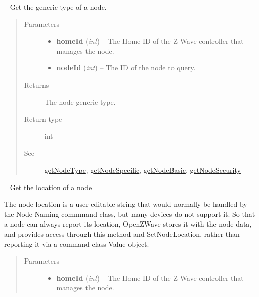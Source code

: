 \documentclass[letterpaper,10pt,english]{sphinxmanual}
\begin{document}
\begin{fulllineitems}
\begin{fulllineitems}
\end{fulllineitems}


\begin{fulllineitems}
\label{libopenzwave:libopenzwave.PyManager.getNodeGeneric}~\label{libopenzwave:getnodegeneric}
Get the generic type of a node.
\begin{quote}\begin{description}
\item[{Parameters}] \leavevmode\begin{itemize}
\item {} 
\textbf{homeId} (\emph{int}) -- The Home ID of the Z-Wave controller that manages the node.

\item {} 
\textbf{nodeId} (\emph{int}) -- The ID of the node to query.

\end{itemize}

\item[{Returns}] \leavevmode
The node generic type.

\item[{Return type}] \leavevmode
int

\item[{See}] \leavevmode
{\hyperref[libopenzwave:getnodetype]{getNodeType}}, {\hyperref[libopenzwave:getnodespecific]{getNodeSpecific}}, {\hyperref[libopenzwave:getnodebasic]{getNodeBasic}}, {\hyperref[libopenzwave:getnodesecurity]{getNodeSecurity}}

\end{description}\end{quote}

\end{fulllineitems}


\begin{fulllineitems}
\label{libopenzwave:libopenzwave.PyManager.getNodeLocation}~\label{libopenzwave:getnodelocation}
Get the location of a node

The node location is a user-editable string that would normally be handled by
the Node Naming commmand class, but many devices do not support it.  So that a
node can always report its location, OpenZWave stores it with the node data,
and provides access through this method and SetNodeLocation, rather than
reporting it via a command class Value object.
\begin{quote}\begin{description}
\item[{Parameters}] \leavevmode\begin{itemize}
\item {} 
\textbf{homeId} (\emph{int}) -- The Home ID of the Z-Wave controller that manages the node.


\end{itemize}
\end{description}
\end{quote}
\end{fulllineitems}
\end{fulllineitems}
\end{document}
